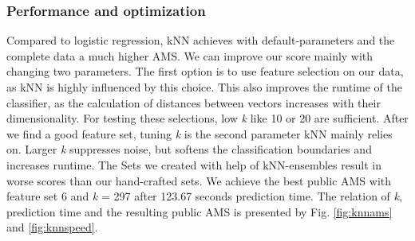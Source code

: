 \subsubsection{Performance and optimization}
Compared to logistic regression, kNN achieves with default-parameters and the complete data a much higher AMS. We can improve our score mainly with changing two parameters. The first option is to use feature selection on our data, as kNN is highly influenced by this choice. This also improves the runtime of the classifier, as the calculation of distances between vectors increases with their dimensionality. For testing these selections, low \emph{k} like 10 or 20 are sufficient. After we find a good feature set, tuning \emph{k} is the second parameter kNN mainly relies on. Larger \emph{k} suppresses noise, but softens the classification boundaries and increases runtime. The Sets we created with help of kNN-ensembles result in worse scores than our hand-crafted sets. We achieve the best public AMS with feature set 6 and \emph{k} = 297 after 123.67 seconds prediction time. The relation of \emph{k}, prediction time and the resulting public AMS is presented by Fig. \ref{fig:knnams} and \ref{fig:knnspeed}.

